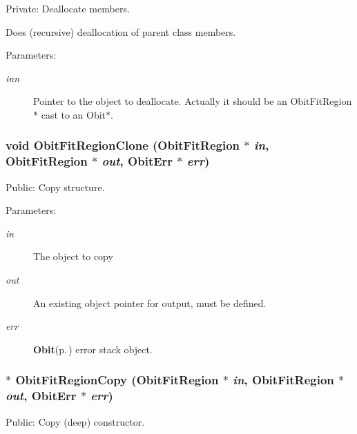 Private: Deallocate members. 

Does (recursive) deallocation of parent class members. \begin{Desc}
\item[Parameters:]
\begin{description}
\item[{\em inn}]Pointer to the object to deallocate. Actually it should be an Obit\-Fit\-Region$\ast$ cast to an Obit$\ast$. \end{description}
\end{Desc}
\subsubsection{\setlength{\rightskip}{0pt plus 5cm}void Obit\-Fit\-Region\-Clone ({\bf Obit\-Fit\-Region} $\ast$ {\em in}, {\bf Obit\-Fit\-Region} $\ast$ {\em out}, {\bf Obit\-Err} $\ast$ {\em err})}\label{ObitFitRegion_8c_a9}


Public: Copy structure. 

\begin{Desc}
\item[Parameters:]
\begin{description}
\item[{\em in}]The object to copy \item[{\em out}]An existing object pointer for output, must be defined. \item[{\em err}]{\bf Obit}{\rm (p.\,\pageref{structObit})} error stack object. \end{description}
\end{Desc}
\subsubsection{$\ast$ Obit\-Fit\-Region\-Copy ({\bf Obit\-Fit\-Region} $\ast$ {\em in}, {\bf Obit\-Fit\-Region} $\ast$ {\em out}, {\bf Obit\-Err} $\ast$ {\em err})}\label{ObitFitRegion_8c_a8}


Public: Copy (deep) constructor. 

